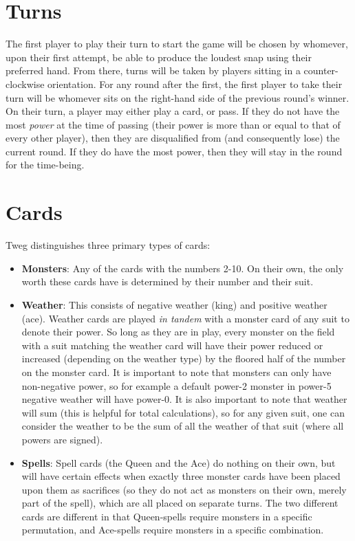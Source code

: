 \documentclass[letterpaper, reqno, 11pt]{article}
\begin{document}
\section*{Turns}
\indent The first player to play their turn to start the game will be chosen by whomever, upon their first attempt, be able to produce the loudest snap using their preferred hand. From there, turns will be taken by players sitting in a counter-clockwise orientation. For any round after the first, the first player to take their turn will be whomever sits on the right-hand side of the previous round's winner.\\
\indent On their turn, a player may either play a card, or pass. If they do not have the most \textit{power} at the time of passing (their power is more than or equal to that of every other player), then they are disqualified from (and consequently lose) the current round. If they do have the most power, then they will stay in the round for the time-being.

\section*{Cards}
Tweg distinguishes three primary types of cards:
\begin{itemize}
\item \textbf{Monsters}: Any of the cards with the numbers 2-10. On their own, the only worth these cards have is determined by their number and their suit.
\item \textbf{Weather}: This consists of negative weather (king) and positive weather (ace). Weather cards are played \textit{in tandem} with a monster card of any suit to denote their power. So long as they are in play, every monster on the field with a suit matching the weather card will have their power reduced or increased (depending on the weather type) by the floored half of the number on the monster card. It is important to note that monsters can only have non-negative power, so for example a default power-2 monster in power-5 negative weather will have power-0. It is also important to note that weather will sum (this is helpful for total calculations), so for any given suit, one can consider the weather to be the sum of all the weather of that suit (where all powers are signed).
\item \textbf{Spells}: Spell cards (the Queen and the Ace) do nothing on their own, but will have certain effects when exactly three monster cards have been placed upon them as sacrifices (so they do not act as monsters on their own, merely part of the spell), which are all placed on separate turns. The two different cards are different in that Queen-spells require monsters in a specific permutation, and Ace-spells require monsters in a specific combination.
\end{itemize}
\end{document}
